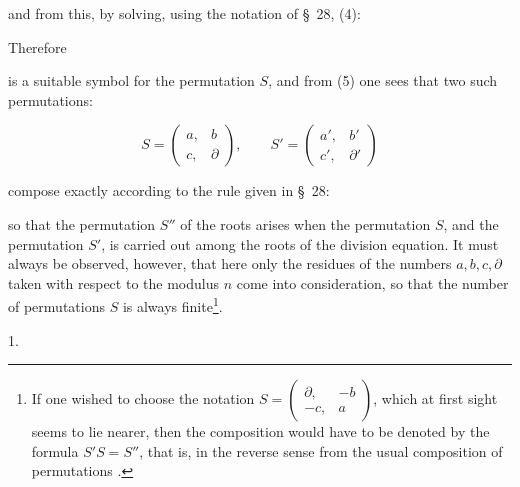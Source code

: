and from this, by solving, using the notation of \S\, 28, (4):


Therefore


is a suitable symbol for the permutation $S$, and from (5) one sees that two such permutations:

\[
S = \begin{pmatrix} a, & b \\ c, & \partial \end{pmatrix}, \qquad S' = \begin{pmatrix} a', & b' \\ c', & \partial' \end{pmatrix}
\]

compose exactly according to the rule given in \S\, 28:


so that the permutation $S''$ of the roots arises when  the permutation $S$, and  the permutation $S'$, is carried out among the roots of the division equation. It must always be observed, however, that here only the residues of the numbers $a, b, c, \partial$ taken with respect to the modulus $n$ come into consideration, so that the number of permutations $S$ is always finite\footnote{If one wished to choose the notation $S = \begin{pmatrix} \partial, & -b \\ -c, & a \end{pmatrix}$, which at first sight seems to lie nearer, then the composition would have to be denoted by the formula $S'S = S''$, that is, in the reverse sense from the usual composition of permutations %
.}.

1. 

